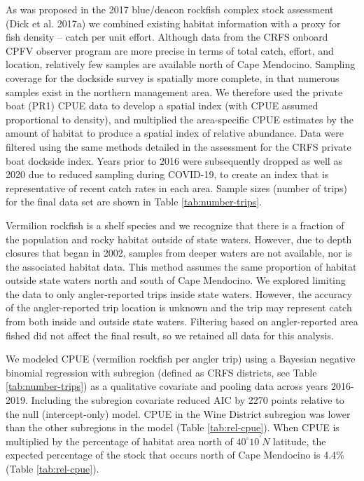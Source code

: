 \documentclass[11pt,
  english,
]{article}
\begin{document}
As was proposed in the 2017 blue/deacon rockfish complex stock assessment {(Dick et al. 2017a)\leavevmode\tagmcend\tagstructend} we combined existing habitat information with a proxy for fish density -- catch per unit effort. Although data from the CRFS onboard CPFV observer program are more precise in terms of total catch, effort, and location, relatively few samples are available north of Cape Mendocino. Sampling coverage for the dockside survey is spatially more complete, in that numerous samples exist in the northern management area. We therefore used the private boat (PR1) CPUE data to develop a spatial index (with CPUE assumed proportional to density), and multiplied the area-specific CPUE estimates by the amount of habitat to produce a spatial index of relative abundance. Data were filtered using the same methods detailed in the assessment for the CRFS private boat dockside index. Years prior to 2016 were subsequently dropped as well as 2020 due to reduced sampling during COVID-19, to create an index that is representative of recent catch rates in each area. Sample sizes (number of trips) for the final data set are shown in Table \ref{tab:number-trips}.

Vermilion rockfish is a shelf species and we recognize that there is a fraction of the population and rocky habitat outside of state waters. However, due to depth closures that began in 2002, samples from deeper waters are not available, nor is the associated habitat data. This method assumes the same proportion of habitat outside state waters north and south of Cape Mendocino. We explored limiting the data to only angler-reported trips inside state waters. However, the accuracy of the angler-reported trip location is unknown and the trip may represent catch from both inside and outside state waters. Filtering based on angler-reported area fished did not affect the final result, so we retained all data for this analysis.

We modeled CPUE (vermilion rockfish per angler trip) using a Bayesian negative binomial regression with subregion (defined as CRFS districts, see Table \ref{tab:number-trips}) as a qualitative covariate and pooling data across years 2016-2019. Including the subregion covariate reduced AIC by 2270 points relative to the null (intercept-only) model. CPUE in the Wine District subregion was lower than the other subregions in the model (Table \ref{tab:rel-cpue}). When CPUE is multiplied by the percentage of habitat area north of $40^\circ 10^\prime N$ latitude, the expected percentage of the stock that occurs north of Cape Mendocino is 4.4\% (Table \ref{tab:rel-cpue}).
\end{document}

